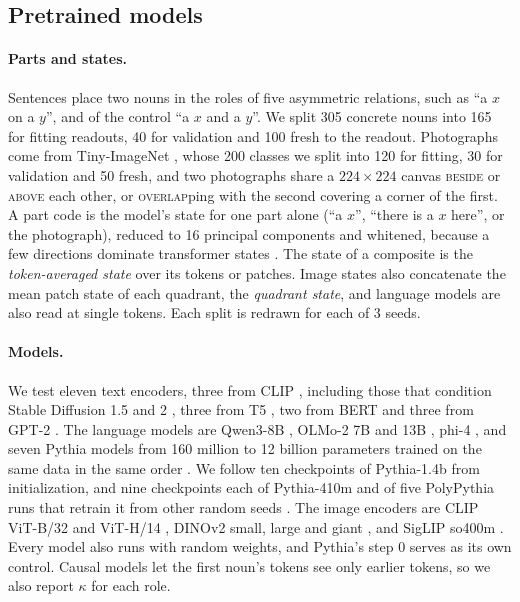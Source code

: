 \subsection{Pretrained models}
\label{sec:design_pretrained}

\paragraph{Parts and states.} Sentences place two nouns in the roles of five asymmetric relations, such as ``a $x$ on a $y$'', and of the control ``a $x$ and a $y$''. We split 305 concrete nouns into 165 for fitting readouts, 40 for validation and 100 fresh to the readout. Photographs come from Tiny-ImageNet \citep{le2015tiny}, whose 200 classes we split into 120 for fitting, 30 for validation and 50 fresh, and two photographs share a $224 \times 224$ canvas \textsc{beside} or \textsc{above} each other, or \textsc{overlap}ping with the second covering a corner of the first. A part code is the model's state for one part alone (``a $x$'', ``there is a $x$ here'', or the photograph), reduced to 16 principal components and whitened, because a few directions dominate transformer states \citep{ethayarajh2019,timkey2021}. The state of a composite is the \emph{token-averaged state} over its tokens or patches. Image states also concatenate the mean patch state of each quadrant, the \emph{quadrant state}, and language models are also read at single tokens. Each split is redrawn for each of 3 seeds.

\paragraph{Models.} We test eleven text encoders, three from CLIP \citep{radford2021clip}, including those that condition Stable Diffusion 1.5 and 2 \citep{rombach2022}, three from T5 \citep{raffel2020t5}, two from BERT \citep{devlin2019bert} and three from GPT-2 \citep{radford2019gpt2}. The language models are Qwen3-8B \citep{yang2025qwen3}, OLMo-2 7B and 13B \citep{olmo2024olmo2}, phi-4 \citep{abdin2024phi4}, and seven Pythia models from 160 million to 12 billion parameters trained on the same data in the same order \citep{biderman2023pythia}. We follow ten checkpoints of Pythia-1.4b from initialization, and nine checkpoints each of Pythia-410m and of five PolyPythia runs that retrain it from other random seeds \citep{vanderwal2025polypythias}. The image encoders are CLIP ViT-B/32 and ViT-H/14 \citep{radford2021clip,cherti2023}, DINOv2 small, large and giant \citep{oquab2024dinov2}, and SigLIP so400m \citep{zhai2023siglip}. Every model also runs with random weights, and Pythia's step 0 serves as its own control. Causal models let the first noun's tokens see only earlier tokens, so we also report $\kappa$ for each role.

